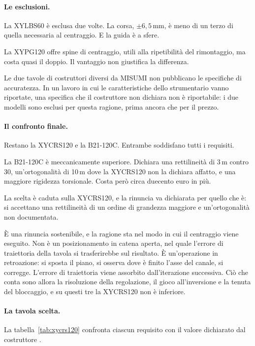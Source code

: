 \paragraph{Le esclusioni.}
La XYLBS60 è esclusa due volte. La corsa, $\pm 6{,}5$\,mm, è meno di un terzo di
quella necessaria al centraggio. E la guida è a sfere.

La XYPG120 offre spine di centraggio, utili alla ripetibilità del rimontaggio,
ma costa quasi il doppio. Il vantaggio non giustifica la differenza.

Le due tavole di costruttori diversi da MISUMI non pubblicano le specifiche di
accuratezza. In un lavoro in cui le caratteristiche dello strumentario vanno
riportate, una specifica che il costruttore non dichiara non è riportabile: i
due modelli sono esclusi per questa ragione, prima ancora che per il prezzo.

\paragraph{Il confronto finale.}
Restano la XYCRS120 e la B21-120C. Entrambe soddisfano tutti i requisiti.

La B21-120C è meccanicamente superiore. Dichiara una rettilineità di
3\,\textmu m contro 30, un'ortogonalità di 10\,\textmu m dove la XYCRS120 non la
dichiara affatto, e una maggiore rigidezza torsionale. Costa però circa
duecento euro in più.

La scelta è caduta sulla XYCRS120, e la rinuncia va dichiarata per quello che è:
si accettano una rettilineità di un ordine di grandezza maggiore e
un'ortogonalità non documentata.

È una rinuncia sostenibile, e la ragione sta nel modo in cui il centraggio viene
eseguito. Non è un posizionamento in catena aperta, nel quale l'errore di
traiettoria della tavola si trasferirebbe sul risultato. È un'operazione in
retroazione: si sposta il piano, si osserva dove è finito l'asse del canale, si
corregge. L'errore di traiettoria viene assorbito dall'iterazione successiva.
Ciò che conta sono allora la risoluzione della regolazione, il gioco
all'inversione e la tenuta del bloccaggio, e su questi tre la XYCRS120 non è
inferiore.

\paragraph{La tavola scelta.}
La tabella~\ref{tab:xycrs120} confronta ciascun requisito con il valore
dichiarato dal costruttore \cite[pp.~1917, 1942]{misumi2014}.

